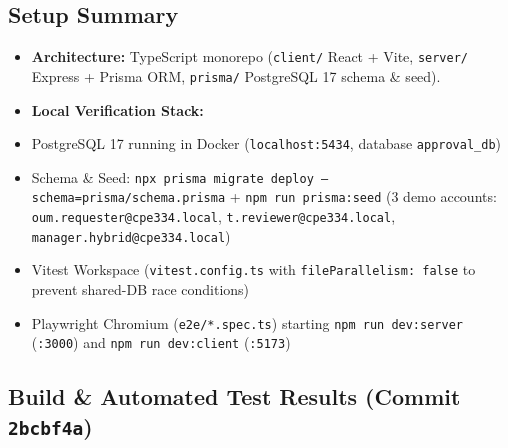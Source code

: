 \documentclass[11pt,a4paper]{article}
\begin{document}
\subsection{Setup Summary}

\begin{itemize}[leftmargin=*,itemsep=2pt,topsep=2pt]
  \item \textbf{Architecture:} TypeScript monorepo (\texttt{client/} React + Vite, \texttt{server/} Express + Prisma ORM, \texttt{prisma/} PostgreSQL 17 schema \& seed).
  \item \textbf{Local Verification Stack:}
  \item PostgreSQL 17 running in Docker (\texttt{localhost:5434}, database \texttt{approval\_db})
  \item Schema \& Seed: \texttt{npx prisma migrate deploy --schema=prisma/schema.prisma} + \texttt{npm run prisma:seed} (3 demo accounts: \texttt{oum.requester@cpe334.local}, \texttt{t.reviewer@cpe334.local}, \texttt{manager.hybrid@cpe334.local})
  \item Vitest Workspace (\texttt{vitest.config.ts} with \texttt{fileParallelism: false} to prevent shared-DB race conditions)
  \item Playwright Chromium (\texttt{e2e/*.spec.ts}) starting \texttt{npm run dev:server} (\texttt{:3000}) and \texttt{npm run dev:client} (\texttt{:5173})
\end{itemize}

\subsection{Build \& Automated Test Results (Commit \texttt{2bcbf4a})}
\end{document}
